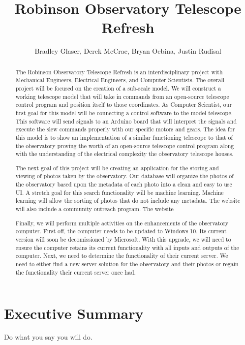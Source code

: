 \documentclass[12pt]{report}
\title{Robinson Observatory Telescope Refresh}
\author{Bradley Glaser, Derek McCrae, Bryan Ocbina, Justin Rudisal}
\begin{document}
\onehalfspacing

\maketitle

\begin{abstract}
The Robinson Observatory Telescope Refresh is an interdisciplinary project with Mechanical Engineers, Electrical Engineers, and Computer Scientists. The overall project will be focused on the creation of a sub-scale model. We will construct a working telescope model that will take in commands from an open-source telescope control program and position itself to those coordinates. As Computer Scientist, our first goal for this model will be connecting a control software to the model telescope. This software will send signals to an Arduino board that will interpret the signals and execute the slew commands properly with our specific motors and gears. The idea for this model is to show an implementation of a similar functioning telescope to that of the observatory proving the worth of an open-source telescope control program along with the understanding of the electrical complexity the observatory telescope houses.

The next goal of this project will be creating an application for the storing and viewing of photos taken by the observatory. Our database will organize the photos of the observatory based upon the metadata of each photo into a clean and easy to use UI. A stretch goal for this search functionality will be machine learning. Machine learning will allow the sorting of photos that do not include any metadata. The website will also include a community outreach program. The website

Finally, we will perform multiple activities on the enhancements of the observatory computer. First off, the computer needs to be updated to Windows 10. Its current version will soon be decomissioned by Microsoft. With this upgrade, we will need to ensure the computer retains its current functionality with all inputs and outputs of the computer. Next, we need to determine the functionality of their current server. We need to either find a new server solution for the observatory and their photos or regain the functionality their current server once had.

\end{abstract}

\section*{Executive Summary}
Do what you say you will do.\cite{heinrich}
\end{document}
